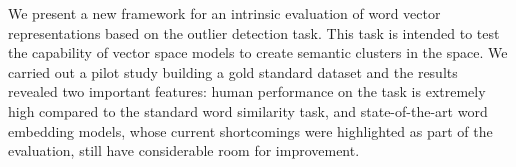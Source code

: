 We present a new framework for an intrinsic evaluation of word vector representations based on the outlier detection task. This task is intended to test the capability of vector space models to create semantic clusters in the space. We carried out a pilot study building a gold standard dataset and the results revealed two important features: human performance on the task is extremely high compared to the standard word similarity task, and state-of-the-art word embedding models, whose current shortcomings were highlighted as part of the evaluation, still have considerable room for improvement.
